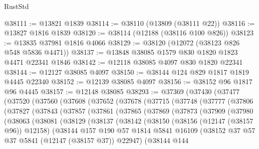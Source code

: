 \begin{lexlean}{RustStd}
\begin{coremodule}
@38111 := @13821 @1839
@38114 := @38110 (@13809 (@38111 @22))
@38116 := @13827 @1816 @1839
@38120 := @38114 (@12188 (@38116 @100 @826))
@38123 := @13835 @37981 @1816 @4066
@38129 := @38120 (@12072 (@38123 @826 @548 @5836 @4471))
@38137 := @13848 @38085 @1579 @830 @1820 @1823 @4471 @22341 @1846
@38142 := @12118 @38085 @4097 @830 @1820 @22341
@38144 := @12127 @38085 @4097
@38150 := @38144 @124 @829 @1817 @1819 @4445 @22340
@38152 := @12139 @38085 @4097
@38156 := @38152 @96 @1817 @96 @4445
@38157 := @12148 @38085
@38293 := @37369
    (@37430
      (@37477
        (@37520
          (@37560
            (@37608
              (@37652
                (@37678
                  (@37715
                    (@37748
                      (@37777
                        (@37806
                          (@37827
                            (@37843
                              (@37857
                                (@37861
                                  (@37865
                                    (@37869
                                      (@37873
                                        (@37909
                                          (@37980
                                            (@38063
                                              (@38081
                                                (@38129
                                                  (@38137
                                                    (@38142
                                                      (@38150
                                                        (@38156 (@12147 (@38157 @96)) @12158)
                                                        (@38144
                                                          @157
                                                          @190
                                                          @57
                                                          @1814
                                                          @5841
                                                          @16109
                                                          (@38152
                                                            @37
                                                            @57
                                                            @37
                                                            @5841
                                                            (@12147 (@38157 @37))
                                                            @22947)
                                                          (@38144
                                                            @144

\end{coremodule}
\end{lexlean}
